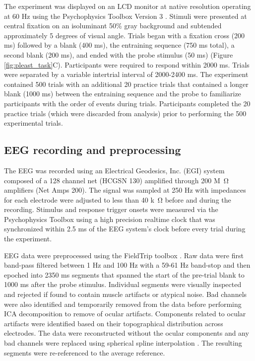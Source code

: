 \documentclass[dwyatte_dissertation.tex]{subfiles}
\begin{document}
The experiment was displayed on an LCD monitor at native resolution operating at 60 Hz using the Psychophysics Toolbox Version 3 \cite{Brainard97,Pelli97}. Stimuli were presented at central fixation on an isoluminant 50\% gray background and subtended approximately 5 degrees of visual angle. Trials began with a fixation cross (200 ms) followed by a blank (400 ms), the entraining sequence (750 ms total), a second blank (200 ms), and ended with the probe stimulus (50 ms) (Figure \ref{fig:pleast_task}C). Participants were required to respond within 2000 ms. Trials were separated by a variable intertrial interval of 2000-2400 ms. The experiment contained 500 trials with an additional 20 practice trials that contained a longer blank (1000 ms) between the entraining sequence and the probe to familiarize participants with the order of events during trials. Participants completed the 20 practice trials (which were discarded from analysis) prior to performing the 500 experimental trials. %

\subsection{EEG recording and preprocessing}
The EEG was recorded using an Electrical Geodesics, Inc. (EGI) system composed of a 128 channel net (HCGSN 130) amplified through 200 M\SI{}{\ohm} amplifiers (Net Amps 200). The signal was sampled at 250 Hz with impedances for each electrode were adjusted to less than 40 k\SI{}{\ohm} before and during the recording. Stimulus and response trigger onsets were measured via the Psychophysics Toolbox using a high precision realtime clock that was synchronized within 2.5 ms of the EEG system's clock before every trial during the experiment.

EEG data were preprocessed using the FieldTrip toolbox \cite{OostenveldFriesMarisEtAl11}. Raw data were first band-pass filtered between 1 Hz and 100 Hz with a 59-61 Hz band-stop and then epoched into 2350 ms segments that spanned the start of the pre-trial blank to 1000 ms after the probe stimulus. Individual segments were visually inspected and rejected if found to contain muscle artifacts or atypical noise. Bad channels were also identified and temporarily removed from the data before performing ICA decomposition \cite{DelormeMakeig04} to remove of ocular artifacts. Components related to ocular artifacts were identified based on their topographical distribution across electrodes. The data were reconstructed without the ocular components and any bad channels were replaced using spherical spline interpolation \cite{PerrinPernierBertrandEtAl89}. The resulting segments were re-referenced to the average reference.
\end{document}
